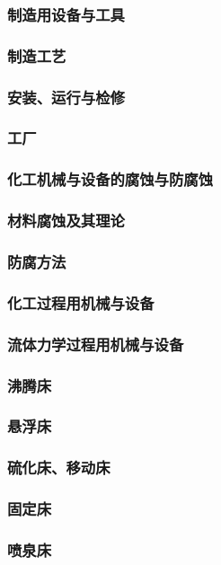 \documentclass[UTF8]{../../ApplicationUniverse}
\begin{document}
    \subsubsection{制造用设备与工具}
    \subsubsection{制造工艺}
    \subsubsection{安装、运行与检修}
    \subsubsection{工厂}
    \subsubsection{化工机械与设备的腐蚀与防腐蚀}
        \subsubsection{材料腐蚀及其理论}
        \subsubsection{防腐方法}
\subsubsection{化工过程用机械与设备}
    \subsubsection{流体力学过程用机械与设备}
        \subsubsection{沸腾床}
        \subsubsection{悬浮床}
        \subsubsection{硫化床、移动床}
        \subsubsection{固定床}
        \subsubsection{喷泉床}
\end{document}
